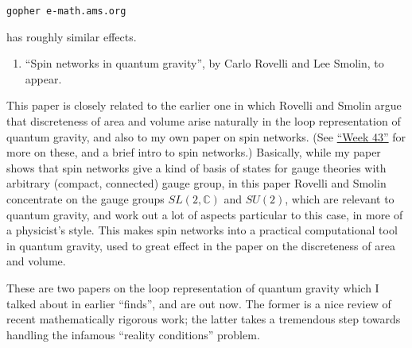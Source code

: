 \documentclass{article}
\def\tightlist{}
\renewcommand{\texttt}[1]{%
  \begingroup
  \ttfamily
  \begingroup\lccode`~=`/\lowercase{\endgroup\def~}{/\discretionary{}{}{}}%
  \begingroup\lccode`~=`[\lowercase{\endgroup\def~}{[\discretionary{}{}{}}%
  \begingroup\lccode`~=`.\lowercase{\endgroup\def~}{.\discretionary{}{}{}}%
  \catcode`/=\active\catcode`[=\active\catcode`.=\active
  \scantokens{#1\noexpand}%
  \endgroup
}
\begin{document}
\begin{verbatim}
gopher e-math.ams.org
\end{verbatim}

has roughly similar effects.

\begin{enumerate}
\def\labelenumi{\arabic{enumi})}
\setcounter{enumi}{2}
\tightlist
\item
  ``Spin networks in quantum gravity'', by Carlo Rovelli and Lee Smolin,
  to appear.
\end{enumerate}

This paper is closely related to the earlier one in which Rovelli and
Smolin argue that discreteness of area and volume arise naturally in the
loop representation of quantum gravity, and also to my own paper on spin
networks. (See \protect\hyperlink{week43}{``Week 43''} for more on
these, and a brief intro to spin networks.) Basically, while my paper
shows that spin networks give a kind of basis of states for gauge
theories with arbitrary (compact, connected) gauge group, in this paper
Rovelli and Smolin concentrate on the gauge groups \(SL(2,\mathbb{C})\)
and \(SU(2)\), which are relevant to quantum gravity, and work out a lot
of aspects particular to this case, in more of a physicist's style. This
makes spin networks into a practical computational tool in quantum
gravity, used to great effect in the paper on the discreteness of area
and volume.


These are two papers on the loop representation of quantum gravity which
I talked about in earlier ``finds'', and are out now. The former is a
nice review of recent mathematically rigorous work; the latter takes a
tremendous step towards handling the infamous ``reality conditions''
problem.
\end{document}
